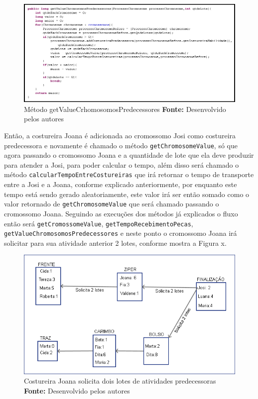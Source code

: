 \begin{figure}[h!]
	\centerline{\includegraphics[scale=0.7]{./imagens/metodo_getValueCrhomosomosPredecessores.png}}
	\caption[Distribuição de trabalho]
	{Método getValueCrhomosomosPredecessores \textbf{Fonte:} Desenvolvido pelos autores}
	\label{fig:exemplo1}
\end{figure}

\par Então, a costureira Joana é adicionada ao cromossomo Josi como costureira predecessora e novamente é chamado o método \texttt{getChromosomeValue}, só que agora passando o cromossomo Joana e a quantidade
de lote que ela deve produzir para atender a Josi, para poder calcular o tempo, além disso será chamado o método 
\texttt{calcularTempoEntreCostureiras} que irá retornar o tempo de transporte entre a Josi e a Joana, conforme explicado
anteriormente, por enquanto este tempo está sendo gerado aleatoriamente, este valor irá ser então
somado como o valor retornado de \texttt{getChromosomeValue} que  será chamado passando o cromossomo Joana. Seguindo as execuções dos
métodos já explicados o fluxo então será \texttt{getCromossomeValue}, \texttt{getTempoRecebimentoPecas}, \texttt{getValueChromosomosPredecessores} e neste ponto o cromossomo Joana irá solicitar para sua atividade anterior 2 lotes, conforme
mostra a Figura x.


\begin{figure}[h!]
	\centerline{\includegraphics[scale=0.7]{./imagens/processo_solciitacao_de_lotes2.png}}
	\caption[Distribuição de trabalho]
	{Costureira Joana solicita dois lotes de atividades predecessoras  \textbf{Fonte:} Desenvolvido pelos autores}
	\label{fig:exemplo1}
\end{figure}


